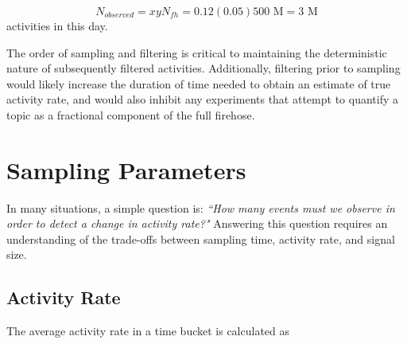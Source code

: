 \documentclass{article}
\begin{document}
\begin{equation}
    \label{eq:sbsample}
    N_{observed} = x y N_{fh}= 0.12 (0.05) 500 \textrm{ M} = 3 \textrm{ M}
\end{equation}
activities in this day. 

The order of sampling and filtering is critical to maintaining the deterministic nature of subsequently 
filtered activities. Additionally, filtering prior to sampling would likely increase the duration of time 
needed to obtain an estimate of true activity rate, and would also inhibit any experiments that attempt 
to quantify a topic as a fractional component of the full firehose.


\section{Sampling Parameters}  
\label{params}

In many situations, a simple question is: 
\emph{``How many events must we observe in order to detect a change in activity rate?"} 
Answering this question requires an understanding of the trade-offs between sampling time, 
activity rate, and signal size.  


\subsection{Activity Rate} 
\label{rate}


\medskip
The\reversemarginpar\marginpar{\raggedleft
%
    \begin{tikzpicture}[scale=0.26]]
\draw [red, very thick, rotate around={60: (0, 0)}] (-0.7, -0.7) rectangle(0.7, 0.7);
%
\draw [very thick, <->] (0.25000000000000006, 0.4330127018922193) -- (1.25, 2.165063509461097) ;
\draw [very thick, <->] (1.75, 2.165063509461097) -- (2.75, 0.4330127018922193) ;
\draw [very thick, <->] (2.5, 0) -- (0.5, 0) ;
%
\draw [orange, ultra thick] (0,0) circle [radius= 0.5 ];
\draw [yellow, ultra thick] ( 1.5 , 2.59807621135 ) circle [radius= 0.5 ];
\draw [green,  ultra thick] ( 3.0 , 0 ) circle [radius= 0.5 ];
    \end{tikzpicture}
%
%
} average activity rate in a time bucket is calculated as
\end{document}
